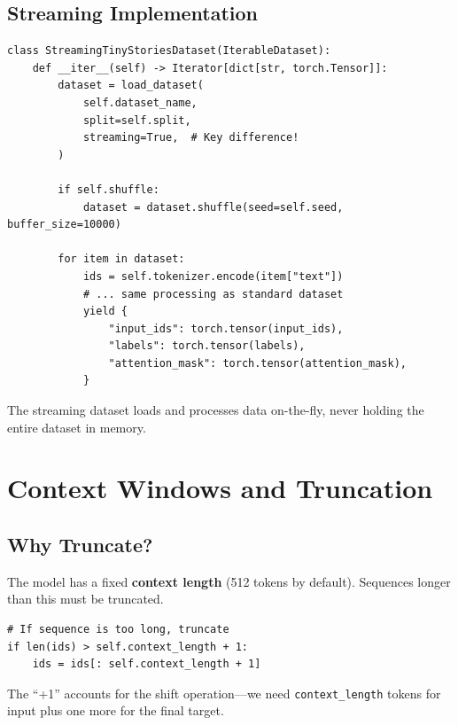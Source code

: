 \subsection{Streaming Implementation}

\begin{lstlisting}[style=python, caption={StreamingTinyStoriesDataset from data.py}]
class StreamingTinyStoriesDataset(IterableDataset):
    def __iter__(self) -> Iterator[dict[str, torch.Tensor]]:
        dataset = load_dataset(
            self.dataset_name,
            split=self.split,
            streaming=True,  # Key difference!
        )

        if self.shuffle:
            dataset = dataset.shuffle(seed=self.seed, buffer_size=10000)

        for item in dataset:
            ids = self.tokenizer.encode(item["text"])
            # ... same processing as standard dataset
            yield {
                "input_ids": torch.tensor(input_ids),
                "labels": torch.tensor(labels),
                "attention_mask": torch.tensor(attention_mask),
            }
\end{lstlisting}

The streaming dataset loads and processes data on-the-fly, never holding the entire dataset in memory.

\section{Context Windows and Truncation}

\subsection{Why Truncate?}

The model has a fixed \textbf{context length} (512 tokens by default). Sequences longer than this must be truncated.

\begin{lstlisting}[style=python]
# If sequence is too long, truncate
if len(ids) > self.context_length + 1:
    ids = ids[: self.context_length + 1]
\end{lstlisting}

The ``+1'' accounts for the shift operation---we need \texttt{context\_length} tokens for input plus one more for the final target.

